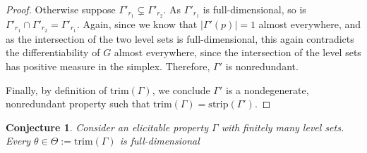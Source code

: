 \documentclass[12pt]{article}
\newcommand{\R}{\mathcal{R}}
\newcommand{\trim}{\mathrm{trim}}
\newcommand{\strip}{\text{strip}}
\newtheorem{conjecture}{Conjecture}
\begin{document}
\begin{proof}
	
	Otherwise suppose $\Gamma'_{r_1} \subsetneq \Gamma'_{r_2}$.
	As $\Gamma'_{r_1}$ is full-dimensional, so is $\Gamma'_{r_1} \cap \Gamma'_{r_2} = \Gamma'_{r_1}$.
	Again, since we know that $|\Gamma'(p)| = 1$ almost everywhere, and as the intersection of the two level sets is full-dimensional, this again contradicts the differentiability of $G$ almost everywhere, since the intersection of the level sets has positive measure in the simplex.
	Therefore, $\Gamma'$ is nonredundant.

		
	Finally, by definition of $\trim(\Gamma)$, we conclude $\Gamma'$ is a nondegenerate, nonredundant property such that $\trim(\Gamma) = \strip(\Gamma')$.
	
\end{proof}


\begin{conjecture}\label{conj:trim-full-dim}
	Consider an elicitable property $\Gamma$ with finitely many level sets.
	Every $\theta \in \Theta := \trim(\Gamma)$ is full-dimensional  
\end{conjecture}
\end{document}
